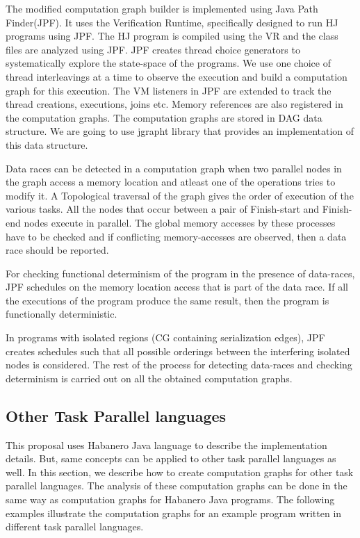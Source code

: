 The modified computation graph builder is implemented using Java Path Finder(JPF). It uses the Verification Runtime, specifically designed to run HJ programs using JPF. The HJ program is compiled using the VR and the class files are analyzed using JPF. JPF creates thread choice generators to systematically explore the state-space of the programs. We use one choice of thread interleavings at a time to observe the execution and build a computation graph for this execution. The VM listeners in JPF are extended to track the thread creations, executions, joins etc. Memory references are also registered in the computation graphs. The computation graphs are stored in DAG data structure. We are going to use jgrapht library that provides an implementation of this data structure.

Data races can be detected in a computation graph when two parallel nodes in the graph access a memory location and atleast one of the operations tries to modify it. A Topological traversal of the graph gives the order of execution of the various tasks. All the nodes that occur between  a pair of Finish-start and Finish-end nodes execute in parallel. The global memory accesses by these processes have to be checked and if conflicting memory-accesses are observed, then a data race should be reported.

For checking functional determinism of the program in the presence of data-races, JPF schedules on the memory location access that is part of the data race. If all the executions of the program produce the same result, then the program is functionally deterministic.

In programs with isolated regions (CG containing serialization edges), JPF creates schedules such that all possible orderings between the interfering isolated nodes is considered. The rest of the process for detecting data-races and checking determinism is carried out on all the obtained computation graphs.

\subsection{Other Task Parallel languages}
This proposal uses Habanero Java language to describe the implementation details. But, same concepts can be applied to other task parallel languages as well. In this section, we describe how to create computation graphs for other task parallel languages. The analysis of these computation graphs can be done in the same way as computation graphs for Habanero Java programs. The following examples illustrate the computation graphs for an example program written in different task parallel languages.

